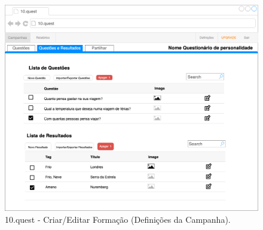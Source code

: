 \begin{figure}[ht!]
	\begin{center}
		\includegraphics[width=1\textwidth]{img/prototipos/q-p-r.png}
		\caption{10.quest - Criar/Editar Formação (Definições da Campanha).}
		\label{10q-q-p-r}
	\end{center}
\end{figure}


